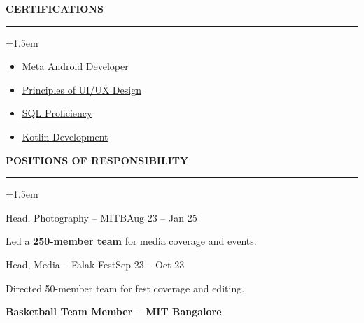 \documentclass{resume}
\begin{document}
\noindent
\begin{minipage}[t]{0.48\textwidth}
{\bf CERTIFICATIONS}
\vspace{3pt}
\hrule
\begin{list}{}{\leftmargin=1.5em}
\item[] \vspace{-1.5mm}
\begin{itemize} \itemsep -1.5pt
    \item Meta Android Developer
    \item \href{https://coursera.org/share/85a70f3471bf3be2ad7426d0ccdab835}{Principles of UI/UX Design}
    \item \href{https://coursera.org/share/23147511054e7c5e5ff43cc74af10e90}{SQL Proficiency}
    \item \href{https://coursera.org/share/4228bec5dc924c26e4a6c8ba5e6ccb96}{Kotlin Development}
\end{itemize}
\end{list}
\end{minipage}
\hfill
\begin{minipage}[t]{0.48\textwidth}
{\bf POSITIONS OF RESPONSIBILITY}
\vspace{3pt}
\hrule
\begin{list}{}{\leftmargin=1.5em}
\item[] \vspace{1.5mm}
\begin{rSubsection}{Head, Photography -- MITB}{\footnotesize Aug 23 -- Jan 25}{}{}\vspace{-4pt}
\item Led a \textbf{250-member team} for media coverage and events.
\end{rSubsection}
\begin{rSubsection}{Head, Media -- Falak Fest}{\footnotesize Sep 23 -- Oct 23}{}{}\vspace{-4pt}
\item Directed 50-member team for fest coverage and editing.
\end{rSubsection}
\vspace{-0.5em}
{\bf Basketball Team Member -- MIT Bangalore}
\end{list}
\end{minipage}
\end{document}
